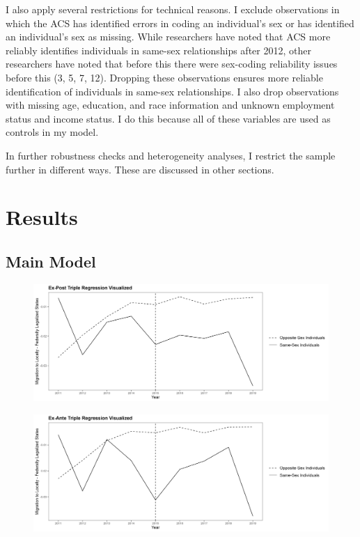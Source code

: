 \documentclass[12pt,letterpaper]{article}
\begin{document}
I also apply several restrictions for technical reasons. I exclude observations in which the ACS has identified errors in coding an individual’s sex or has identified an individual’s sex as missing. While researchers have noted that ACS more reliably identifies individuals in same-sex relationships after 2012, other researchers have noted that before this there were sex-coding reliability issues before this (3, 5, 7, 12). Dropping these observations ensures more reliable identification of individuals in same-sex relationships. I also drop observations with missing age, education, and race information and unknown employment status and income status. I do this because all of these variables are used as controls in my model.

\begin{landscape}
\tiny

\end{landscape}

In further robustness checks and heterogeneity analyses, I restrict the sample further in different ways. These are discussed in other sections. 

\clearpage

\section{Results}


\subsection{Main Model}
\clearpage
\begin{figure}
    \centering
    \includegraphics[width=1\linewidth]{outputs/summary_stats/post_diffs.png}
    \label{fig:enter-label}
\end{figure}



\begin{figure}
    \centering
    \includegraphics[width=1\linewidth]{outputs/summary_stats/ante_diffs.png}
    \label{fig:enter-label}
\end{figure}
\end{document}
